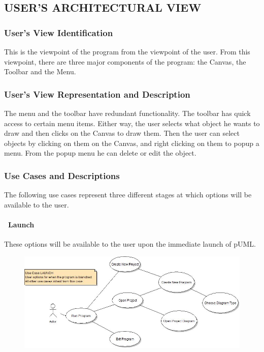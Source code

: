 \documentclass[twoside,letterpaper]{article}
\begin{document}
{\clearpage
\subsection[USER{\textquoteright}S ARCHITECTURAL
VIEW]{\bfseries\color{black}
USER{\textquoteright}S ARCHITECTURAL VIEW}

\subsubsection{User{\textquoteright}s View Identification}

{\color{black}
This is the viewpoint of the program from the viewpoint of the user.
From this viewpoint, there are three major components of the
program: the Canvas, the Toolbar and the Menu. }

\subsubsection{User{\textquoteright}s View Representation and
Description }
{\color{black}
The menu and the toolbar have redundant functionality. The toolbar has
quick access to certain menu items. Either way, the user selects what object
he wants to draw and then clicks on the Canvas to draw them. Then the user
can select objects by clicking on them on the Canvas, and right clicking
on them to popup a menu. From the popup menu he can delete or edit the object.}

\subsubsection{Use Cases and Descriptions}
{\color{black}
The following use cases represent three different stages at which options will be available to the user.
}



\paragraph[\ Use Category]
{\ Launch} {\color{black}
These options will be available to the user upon the immediate launch of pUML.
}

\bigskip
\bigskip

\begin{figure}[h]
\centering
\includegraphics[width=6.0in]{ucaseLaunch.jpg}
\end{figure}



}
\end{document}
